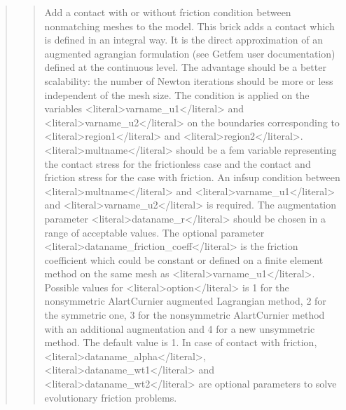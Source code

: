 \documentclass[a4paper,11pt,english]{sphinxmanual}
\begin{document}
\begin{quote}
\begin{quote}
\sphinxAtStartPar
Add a contact with or without friction condition between nonmatching
meshes to the model. This brick adds a contact which is defined
in an integral way. It is the direct approximation of an augmented
agrangian formulation (see Getfem user documentation) defined at the
continuous level. The advantage should be a better scalability:
the number of Newton iterations should be more or less independent
of the mesh size.
The condition is applied on the variables \textless{}literal\textgreater{}varname\_u1\textless{}/literal\textgreater{} and \textless{}literal\textgreater{}varname\_u2\textless{}/literal\textgreater{}
on the boundaries corresponding to \textless{}literal\textgreater{}region1\textless{}/literal\textgreater{} and \textless{}literal\textgreater{}region2\textless{}/literal\textgreater{}.
\textless{}literal\textgreater{}multname\textless{}/literal\textgreater{} should be a fem variable representing the contact stress
for the frictionless case and the contact and friction stress for the
case with friction. An inf\sphinxhyphen{}sup condition between \textless{}literal\textgreater{}multname\textless{}/literal\textgreater{} and
\textless{}literal\textgreater{}varname\_u1\textless{}/literal\textgreater{} and \textless{}literal\textgreater{}varname\_u2\textless{}/literal\textgreater{} is required.
The augmentation parameter \textless{}literal\textgreater{}dataname\_r\textless{}/literal\textgreater{} should be chosen in a
range of acceptable values.
The optional parameter \textless{}literal\textgreater{}dataname\_friction\_coeff\textless{}/literal\textgreater{} is the friction
coefficient which could be constant or defined on a finite element
method on the same mesh as \textless{}literal\textgreater{}varname\_u1\textless{}/literal\textgreater{}.
Possible values for \textless{}literal\textgreater{}option\textless{}/literal\textgreater{} is 1 for the non\sphinxhyphen{}symmetric Alart\sphinxhyphen{}Curnier
augmented Lagrangian method, 2 for the symmetric one, 3 for the
non\sphinxhyphen{}symmetric Alart\sphinxhyphen{}Curnier method with an additional augmentation
and 4 for a new unsymmetric method. The default value is 1.
In case of contact with friction, \textless{}literal\textgreater{}dataname\_alpha\textless{}/literal\textgreater{}, \textless{}literal\textgreater{}dataname\_wt1\textless{}/literal\textgreater{} and
\textless{}literal\textgreater{}dataname\_wt2\textless{}/literal\textgreater{} are optional parameters to solve evolutionary friction
problems.
\end{quote}


\end{quote}
\end{document}
